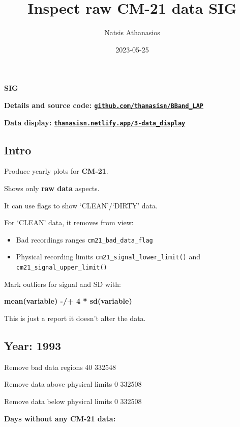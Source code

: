 \documentclass[
  10pt,
  a4paper,oneside]{article}
\title{Inspect raw CM-21 data \textbf{SIG}}
\author{Natsis Athanasios}
\date{2023-05-25}
\providecommand{\tightlist}{%
  \setlength{\itemsep}{0pt}\setlength{\parskip}{0pt}}
\begin{document}
\maketitle

{
\hypersetup{linkcolor=}
\setcounter{tocdepth}{4}
\tableofcontents
}
\textbf{SIG}

\textbf{Details and source code: \href{https://github.com/thanasisn/BBand_LAP}{\texttt{github.com/thanasisn/BBand\_LAP}}}

\textbf{Data display: \href{https://thanasisn.netlify.app/3-data_display}{\texttt{thanasisn.netlify.app/3-data\_display}}}

\hypertarget{intro}{%
\subsection{Intro}\label{intro}}

Produce yearly plots for \textbf{CM-21}.

Shows only \textbf{raw data} aspects.

It can use flags to show `CLEAN'/`DIRTY' data.

For `CLEAN' data, it removes from view:

\begin{itemize}
\tightlist
\item
  Bad recordings ranges \texttt{cm21\_bad\_data\_flag}
\item
  Physical recording limits \texttt{cm21\_signal\_lower\_limit()} and \texttt{cm21\_signal\_upper\_limit()}
\end{itemize}

Mark outliers for signal and SD with:

\textbf{mean(variable) -/+ 4 * sd(variable)}

This is just a report it doesn't alter the data.

\FloatBarrier

\newpage

\hypertarget{year-1993}{%
\subsection{Year: 1993}\label{year-1993}}

Remove bad data regions
40 332548

Remove data above physical limits
0 332508

Remove data below physical limits
0 332508

\textbf{Days without any CM-21 data:}
\end{document}
